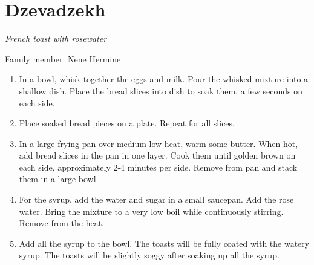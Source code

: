 \chapter{Dzevadzekh}
\label{ch:frenchtoast}


\textit{French toast with rosewater}

Family member: Nene Hermine

\begin{enumerate}
    \item In a bowl, whisk together the eggs and milk. Pour the whisked mixture into a shallow dish. Place the bread slices into dish to soak them, a few seconds on each side.
    \item Place soaked bread pieces on a plate. Repeat for all slices.
    \item In a large frying pan over medium-low heat, warm some butter. When hot, add bread slices in the pan in one layer. Cook them until golden brown on each side, approximately 2-4 minutes per side. Remove from pan and stack them in a large bowl.
    \item For the syrup, add the water and sugar in a small saucepan. Add the rose water. Bring the mixture to a very low boil while continuously stirring. Remove from the heat.
    \item Add all the syrup to the bowl. The toasts will be fully coated with the watery syrup. The toasts will be slightly soggy after soaking up all the syrup.
\end{enumerate}

